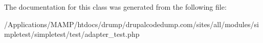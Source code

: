 The documentation for this class was generated from the following file:\begin{DoxyCompactItemize}
\item 
/Applications/MAMP/htdocs/drump/drupalcodedump.com/sites/all/modules/simpletest/simpletest/test/adapter\_\-test.php\end{DoxyCompactItemize}
